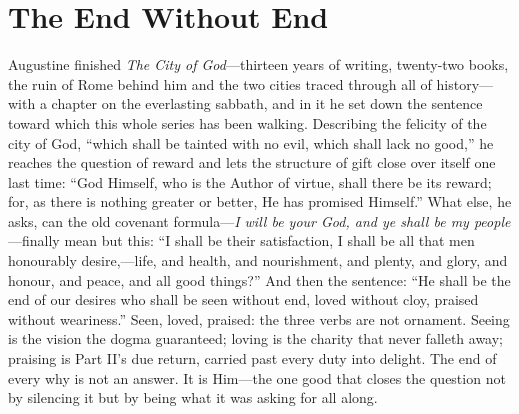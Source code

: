 \section{The End Without End}

Augustine finished \emph{The City of God}---thirteen years of writing, twenty-two books, the ruin of Rome behind him and the two cities traced through all of history---with a chapter on the everlasting sabbath, and in it he set down the sentence toward which this whole series has been walking. Describing the felicity of the city of God, ``which shall be tainted with no evil, which shall lack no good,'' he reaches the question of reward and lets the structure of gift close over itself one last time: ``God Himself, who is the Author of virtue, shall there be its reward; for, as there is nothing greater or better, He has promised Himself.'' What else, he asks, can the old covenant formula---\emph{I will be your God, and ye shall be my people}---finally mean but this: ``I shall be their satisfaction, I shall be all that men honourably desire,---life, and health, and nourishment, and plenty, and glory, and honour, and peace, and all good things?'' And then the sentence: ``He shall be the end of our desires who shall be seen without end, loved without cloy, praised without weariness.'' Seen, loved, praised: the three verbs are not ornament. Seeing is the vision the dogma guaranteed; loving is the charity that never falleth away; praising is Part II's due return, carried past every duty into delight. The end of every why is not an answer. It is Him---the one good that closes the question not by silencing it but by being what it was asking for all along.

